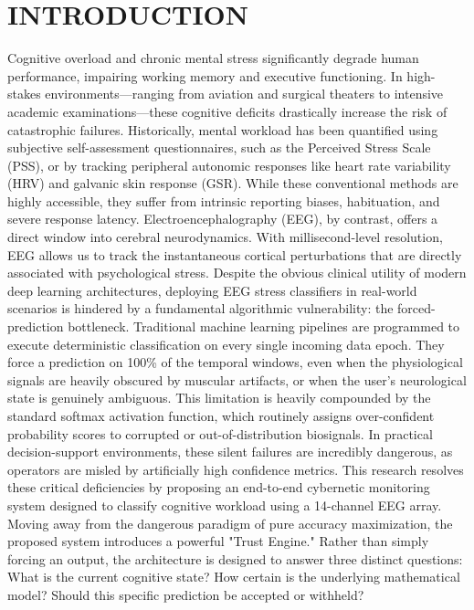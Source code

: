 \documentclass[conference,a4paper]{IEEEtran}
\begin{document}
\section{INTRODUCTION}
Cognitive overload and chronic mental stress significantly degrade human performance, impairing working memory and executive functioning. In high-stakes environments---ranging from aviation and surgical theaters to intensive academic examinations---these cognitive deficits drastically increase the risk of catastrophic failures. Historically, mental workload has been quantified using subjective self-assessment questionnaires, such as the Perceived Stress Scale (PSS), or by tracking peripheral autonomic responses like heart rate variability (HRV) and galvanic skin response (GSR). While these conventional methods are highly accessible, they suffer from intrinsic reporting biases, habituation, and severe response latency. Electroencephalography (EEG), by contrast, offers a direct window into cerebral neurodynamics. With millisecond-level resolution, EEG allows us to track the instantaneous cortical perturbations that are directly associated with psychological stress. Despite the obvious clinical utility of modern deep learning architectures, deploying EEG stress classifiers in real-world scenarios is hindered by a fundamental algorithmic vulnerability: the forced-prediction bottleneck. Traditional machine learning pipelines are programmed to execute deterministic classification on every single incoming data epoch. They force a prediction on 100\% of the temporal windows, even when the physiological signals are heavily obscured by muscular artifacts, or when the user's neurological state is genuinely ambiguous. This limitation is heavily compounded by the standard softmax activation function, which routinely assigns over-confident probability scores to corrupted or out-of-distribution biosignals. In practical decision-support environments, these silent failures are incredibly dangerous, as operators are misled by artificially high confidence metrics. This research resolves these critical deficiencies by proposing an end-to-end cybernetic monitoring system designed to classify cognitive workload using a 14-channel EEG array. Moving away from the dangerous paradigm of pure accuracy maximization, the proposed system introduces a powerful "Trust Engine." Rather than simply forcing an output, the architecture is designed to answer three distinct questions: What is the current cognitive state? How certain is the underlying mathematical model? Should this specific prediction be accepted or withheld?
\end{document}
